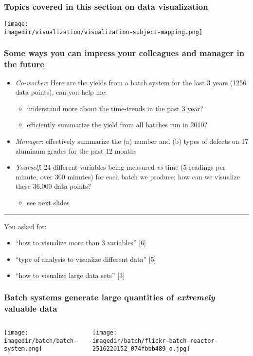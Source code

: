 \begin{frame}\frametitle{Topics covered in this section on data visualization}
	\begin{center}
		\texttt{[image: \\imagedir/visualization/visualization-subject-mapping.png]}
	\end{center}
\end{frame}

\begin{frame}\frametitle{Some ways you can impress your colleagues and manager in the future}
	\begin{itemize}
		\item	\emph{Co-worker}: Here are the yields from a batch system for the last 3 years (1256 data points), can you help me: 
		\begin{itemize}
			\item	understand more about the time-trends in the past 3 year? 
			\item	efficiently summarize the yield from all batches run in 2010?
		\end{itemize}
		\item	\emph{Manager}: effectively summarize the (a) number and (b) types of defects on 17 aluminum grades for the past 12 months \pause 
		\item	\emph{Yourself}: 24 different variables being measured \emph{vs} time (5 readings per minute, over 300 minutes) for each batch we produce; how can we visualize these 36,000 data points? 
		\begin{itemize}
			\item	see next slides
		\end{itemize}
	\end{itemize}
	\hrule
	
	\vspace{6pt}
	You asked for:
	\begin{itemize}
		\item	``how to visualize more than 3 variables'' [6]
		\item	``type of analysis to visualize different data'' [5]
		\item	``how to visualize large data sets'' [3]
	\end{itemize}
\end{frame}

\begin{frame}\frametitle{Batch systems generate large quantities of \emph{extremely} valuable data}
	\begin{columns}[t]
			\begin{center}
				\texttt{[image: \\imagedir/batch/batch-system.png]}
			\end{center}
			
			\begin{center}
				\texttt{[image: \\imagedir/batch/flickr-batch-reactor-2516220152\_074fbbb489\_o.jpg]}
			\end{center}
	\end{columns}
\end{frame}


